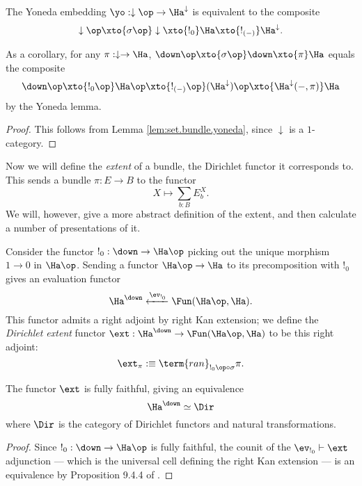 \begin{lem}\label{lem:type.bundle.yoneda}
The Yoneda embedding $\yo : \downarrow\op \to \Ha^{\downarrow}$ is equivalent to the
composite $$\downarrow\op \xto{\sigma\op} \downarrow \xto{!_{0}} \Ha
\xto{!_{(-)}} \Ha^{\downarrow}.$$

As a corollary, for any $\pi : \downarrow \to \Ha$, $\down\op \xto{\sigma\op}
\down \xto{\pi} \Ha$ equals the composite
$$\down\op \xto{!_0\op} \Ha\op \xto{!_{(-)}\op}
(\Ha^{\downarrow})\op \xto{\Ha^{\downarrow}(-, \pi)} \Ha$$
by the Yoneda lemma.
\end{lem}
\begin{proof}
  This follows from Lemma \ref{lem:set.bundle.yoneda}, since $\downarrow$ is a $1$-category.
\end{proof}

Now we will define the \emph{extent} of a bundle, the Dirichlet functor it
corresponds to. This sends a bundle
$\pi : E \to B$ to the functor
$$X \mapsto \sum_{b : B} E_b^X.$$
We will, however, give a more abstract definition of the extent, and then
calculate a number of presentations of it.

\begin{defn}
Consider the functor $!_0 : \down \to \Ha\op$ picking out the unique morphism $1\to 0$ in $\Ha\op$. Sending a functor $\Ha\op\to\Ha$ to its precomposition with $!_0$ gives an evaluation functor
  $$\Ha^{\down} \xleftarrow{\ev_{!_0}} \Fun(\Ha\op, \Ha).$$
  This functor admits a right adjoint by right Kan extension; we define the
  \emph{Dirichlet extent} functor $\ext : \Ha^{\down} \to \Fun(\Ha\op,
  \Ha)$ to be this right adjoint:
  $$\ext_{\pi} :\equiv \term{ran}_{!_0\op \circ \sigma} \pi.$$
\end{defn}

\begin{prop}
  The functor $\ext$ is fully faithful, giving an equivalence 
  $$\Ha^{\down} \simeq \Dir$$
  where $\Dir$ is the category of Dirichlet functors and natural transformations.
\end{prop}
\begin{proof}
Since $!_0 : \down \to \Ha\op$ is fully faithful, the counit of the
$\ev_{!_0} \vdash \ext$ adjunction --- which is the universal cell defining the
right Kan extension --- is an equivalence by Proposition 9.4.4 of \cite{RV:Elements}. 
\end{proof}


